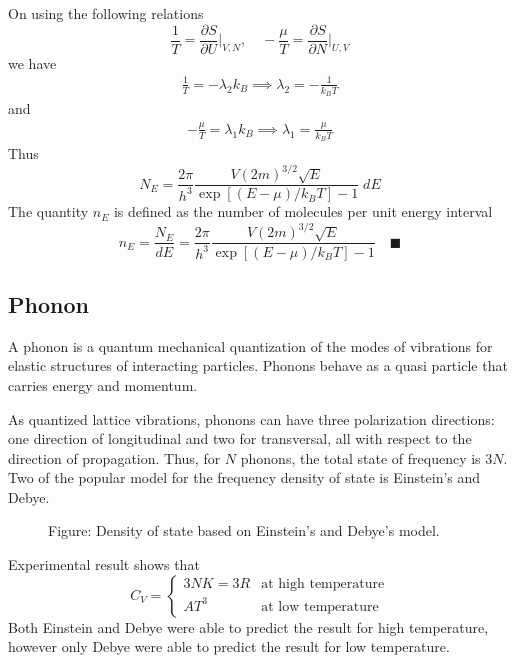 \documentclass[../../../Main.tex]{subfiles}
\begin{document}
On using the following relations
\begin{equation*}
    \frac{1}{T}=\frac{\partial S}{\partial U}\bigg|_{V,N},\quad -\frac{\mu}{T}=\frac{\partial S}{\partial N}\bigg|_{U,V}
\end{equation*}
we have 
\begin{align*}
    \frac{1}{T}=-\lambda_2k_B\implies
    \lambda_2=-\frac{1}{k_BT}
\end{align*}
and
\begin{align*}
    -\frac{\mu}{T}=\lambda_1k_B\implies
    \lambda_1=\frac{\mu}{k_BT}
\end{align*}
Thus
\begin{equation*}
    N_E=\frac{2\pi}{h^3} \frac{V (2m)^{3/2}\sqrt{E}}{\exp\left[(E-\mu)/k_BT\right]-1} \;dE
\end{equation*}
The quantity $n_E$ is defined as the number of molecules per unit energy interval
\begin{equation*}
    n_E=\frac{N_E}{dE}=\frac{2\pi}{h^3} \frac{V (2m)^{3/2}\sqrt{E}}{\exp\left[(E-\mu)/k_BT\right]-1} \quad\blacksquare
\end{equation*}
 
\subsection{Phonon}
A phonon is a quantum mechanical quantization of the modes of vibrations for elastic structures of interacting particles. Phonons behave as a quasi particle that carries energy and momentum. 

As quantized lattice vibrations, phonons can have three polarization directions: one direction of longitudinal and two for transversal, all with respect to the direction of propagation. Thus, for $N$ phonons, the total state of frequency is $3N$. Two of the popular model for the frequency density of state is Einstein's and Debye.
\begin{figure}
    \centering
    \caption*{Figure: Density of state based on Einstein's and Debye's model.}
\end{figure}

Experimental result shows that
\begin{equation*}
    C_V=\begin{cases}
        3NK=3R&\text{at high temperature}\\
        AT^3&\text{at low temperature}
    \end{cases}
\end{equation*}
Both Einstein and Debye were able to predict the result for high temperature, however only Debye were able to predict the result for low temperature.
\end{document}
